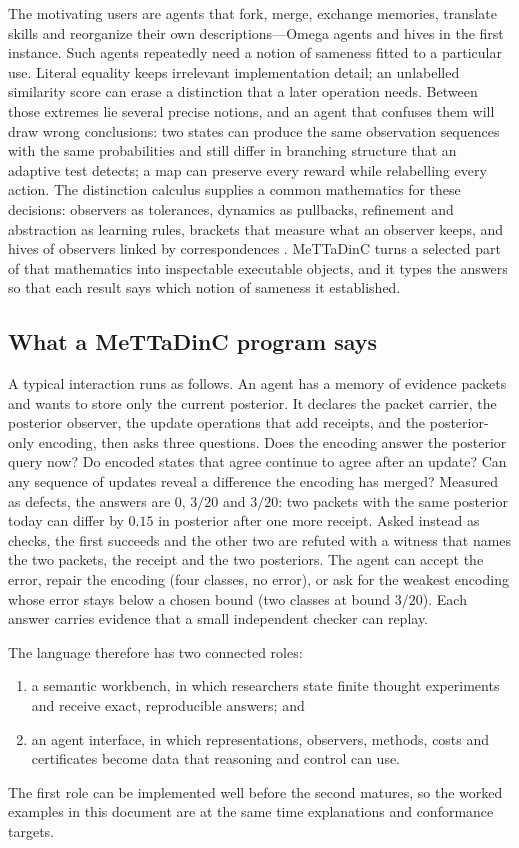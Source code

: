 \documentclass[11pt]{article}
\theoremstyle{definition}
\theoremstyle{plain}
\begin{document}
The motivating users are agents that fork, merge, exchange memories, translate skills and
reorganize their own descriptions---Omega agents and hives in the first instance. Such agents
repeatedly need a notion of sameness fitted to a particular use. Literal equality keeps
irrelevant implementation detail; an unlabelled similarity score can erase a distinction that
a later operation needs. Between those extremes lie several precise notions, and an agent
that confuses them will draw wrong conclusions: two states can produce the same observation
sequences with the same probabilities and still differ in branching structure that an adaptive
test detects; a map can preserve every reward while relabelling every action. The distinction
calculus supplies a common mathematics for these decisions: observers as tolerances, dynamics as
pullbacks, refinement and abstraction as learning rules, brackets that measure what an observer
keeps, and hives of observers linked by correspondences \cite{dcnotes,dclosure,paperone}.
MeTTaDinC turns a selected part of that mathematics into inspectable executable objects, and it
types the answers so that each result says which notion of sameness it established.

\subsection{What a MeTTaDinC program says}

A typical interaction runs as follows. An agent has a memory of evidence packets and wants to
store only the current posterior. It declares the packet carrier, the posterior observer, the
update operations that add receipts, and the posterior-only encoding, then asks three
questions. Does the encoding answer the posterior query now? Do encoded states that agree
continue to agree after an update? Can any sequence of updates reveal a difference the encoding
has merged? Measured as defects, the answers are $0$, $3/20$ and $3/20$: two packets with the
same posterior today can differ by $0.15$ in posterior after one more receipt. Asked instead as
checks, the first succeeds and the other two are refuted with a witness that names the two
packets, the receipt and the two posteriors. The agent can accept the error, repair the
encoding (four classes, no error), or ask for the weakest encoding whose error stays below a
chosen bound (two classes at bound $3/20$). Each answer carries evidence that a small
independent checker can replay.

The language therefore has two connected roles:
\begin{enumerate}
\item a semantic workbench, in which researchers state finite thought experiments and receive
exact, reproducible answers; and
\item an agent interface, in which representations, observers, methods, costs and certificates
become data that reasoning and control can use.
\end{enumerate}
The first role can be implemented well before the second matures, so the worked examples in
this document are at the same time explanations and conformance targets.
\end{document}
